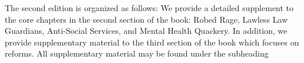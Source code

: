 The second edition is organized as follows: We provide a detailed
supplement to the core chapters in the second section of the book:
Robed Rage, Lawless Law Guardians, Anti-Social Services, and Mental
Health Quackery. In addition, we provide supplementary material to the
third section of the book which focuses on reforms. All supplementary
material may be found under the subheading  \pfl{}



